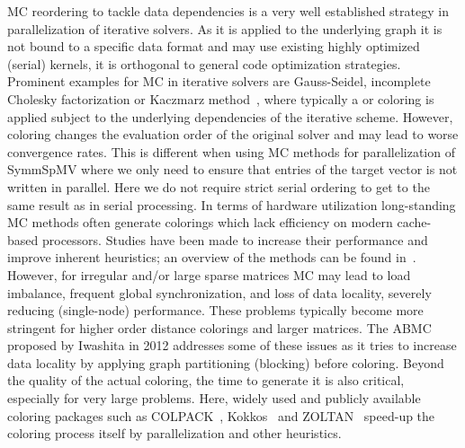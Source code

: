 
\Acrfull{MC} reordering to tackle data dependencies is a very well established strategy in parallelization of iterative solvers. As it is applied to the underlying graph it is not bound to a specific data format and may use existing highly optimized (serial) kernels, \ie it is orthogonal to general code optimization strategies.  
Prominent examples for  \acrshort{MC} in iterative solvers are Gauss-Seidel, incomplete 
Cholesky factorization or Kaczmarz method~\cite{RBGS,MC,feast_mc}, where typically a \DONE or \DTWO coloring is applied subject to the underlying dependencies of the iterative scheme. However, coloring changes the evaluation order of the original solver and may lead to worse convergence rates. This is different when using  \acrshort{MC} methods for parallelization of \acrshort{SymmSpMV} where we only need to ensure that entries of the target vector is not written in parallel. Here we do not  require strict serial ordering to get to the same result as in serial processing.
In terms of hardware utilization long-standing \acrshort{MC} methods often generate colorings which lack efficiency on modern cache-based
processors. Studies have been made to increase their
performance and improve inherent heuristics; an overview of the methods can be found in~\cite{gebremedhin2000scalable,dist_k_def,COLPACK,equitable_color}.
 However, 
for irregular and/or large sparse 
matrices \acrshort{MC} may lead to load imbalance, frequent global synchronization, 
and loss of data locality, severely reducing (single-node) performance. 
These problems typically become more stringent for higher order distance
colorings and larger matrices.
The \acrfull{ABMC}~\cite{ABMC} proposed by Iwashita \etal in 2012 addresses some of these issues as it tries to increase data locality by applying graph partitioning (blocking) before coloring. 
Beyond the quality of the actual coloring, the time to generate it is also critical, especially for very large problems. Here, widely used and publicly available coloring packages such as COLPACK~\cite{COLPACK}, Kokkos~\cite{kokkos} and ZOLTAN~\cite{BOZDAG2008515,doi:10.1137/080732158} speed-up the coloring process itself by parallelization and other heuristics. 

